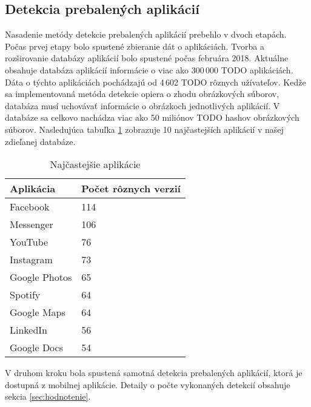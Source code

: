 \subsection{Detekcia prebalených aplikácií}
Nasadenie metódy detekcie prebalených aplikácií prebehlo v dvoch etapách. Počas prvej etapy bolo spustené zbieranie dát o aplikáciách. Tvorba a rozširovanie databázy aplikácií bolo spustené počas februára 2018. Aktuálne obsahuje databáza aplikácií informácie o viac ako 300\,000 TODO aplikáciách. Dáta o týchto aplikáciách pochádzajú od 4\,602 TODO rôznych užívateľov. Kedže sa implementovaná metóda detekcie opiera o zhodu obrázkových súborov, databáza musí uchovávať informácie o obrázkoch jednotlivých aplikácií. V databáze sa celkovo nachádza viac ako 50 miliónov TODO hashov obrázkových súborov.
Nasledujúca tabuľka \ref{apps-common} zobrazuje 10 najčastejších aplikácií v našej zdieľanej databáze.

\begin{table}[]
\centering
\begin{tabular}{|l|l|}
\hline
Aplikácia     & Počet rôznych verzií \\ \hline
Facebook      & 114                  \\
Messenger     & 106                  \\
YouTube       & 76                   \\
Instagram     & 73                   \\
Google Photos & 65                   \\
Spotify       & 64                   \\
Google Maps   & 64                   \\
LinkedIn      & 56                   \\
Google Docs   & 54                   \\ \hline
\end{tabular}
\caption{Najčastejšie aplikácie}
\label{apps-common}
\end{table}

V druhom kroku bola spustená samotná detekcia prebalených aplikácií, ktorá je dostupná z mobilnej aplikácie. Detaily o počte vykonaných detekcií obsahuje sekcia \ref{sec:hodnotenie}.

